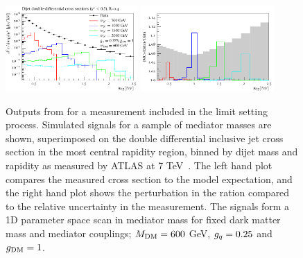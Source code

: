 \documentclass[floatfix]{article}
\begin{document}
\begin{figure}[!htb]
\centering
      \includegraphics[width=0.45\textwidth]{images/atlasdijet/fullscale/ATLAS_dijet.pdf}
      \includegraphics[width=0.45\textwidth]{images/atlasdijet/ratio/ATLAS_dijet_ratio.pdf}
    \caption{ Outputs from \rivet for a measurement included in the limit setting process. Simulated signals for a sample of mediator masses are shown, superimposed 
on the double differential inclusive jet cross section in the most central rapidity region, binned by dijet mass and rapidity as measured by ATLAS at 
7 TeV~\cite{Aad:2014pua}. The left hand plot compares the measured cross section to the model expectation, and the right hand plot shows the perturbation 
in the ration compared to the relative uncertainty in the measurement. 
The signals form a 1D parameter space scan in mediator mass for fixed dark matter mass and mediator couplings; $M_{\rm DM}=600$ GeV, 
$g_{q}=0.25$ and $g_{\rm DM} = 1$.}
\label{fig:ATLASdijet}
\end{figure}

\end{document}
